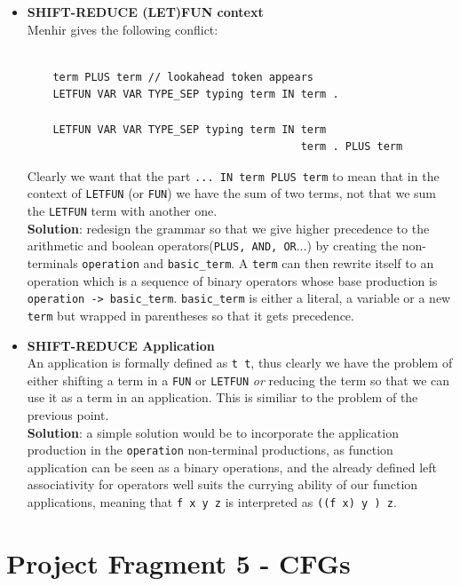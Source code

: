 \documentclass[a4paper,11pt]{report}
\begin{document}
\begin{itemize}
    \item \textbf{SHIFT-REDUCE (LET)FUN context}\\
    Menhir gives the following conflict:
    \begin{lstlisting}

    term PLUS term // lookahead token appears
    LETFUN VAR VAR TYPE_SEP typing term IN term . 

    LETFUN VAR VAR TYPE_SEP typing term IN term 
                                           term . PLUS term 
    \end{lstlisting}
    Clearly we want that the part \verb|... IN term PLUS term| to mean that in the context of \verb|LETFUN| (or \verb|FUN|) we have the sum of two terms, not that we sum the \verb|LETFUN| term with another one. \\
    \textbf{Solution}: redesign the grammar so that we give higher precedence to the arithmetic and boolean operators(\verb|PLUS, AND, OR|...) by creating the non-terminals \verb|operation| and \verb|basic_term|. A \verb|term| can then rewrite itself to an operation which is a sequence of binary operators whose base production is \verb|operation -> basic_term|. \verb|basic_term| is either a literal, a variable or a new \verb|term| but wrapped in parentheses so that it gets precedence.
    
\item \textbf{SHIFT-REDUCE Application}\\
    An application is formally defined as \verb|t t|, thus clearly we have the problem of either shifting 
    a term in a \verb|FUN| or \verb|LETFUN| \textit{or} reducing the term so that we can use it as a term in an application. This is similiar to the problem of the previous point. \\
    \textbf{Solution}: a simple solution would be to incorporate the application production in the \verb|operation| non-terminal productions, as function application can be seen as a binary operations, and the already defined left associativity for operators well suits the currying ability of our function applications, meaning that \verb|f x y z| is interpreted as \verb|((f x) y ) z|.

\end{itemize}

\section{Project Fragment 5 - CFGs}
\end{document}
